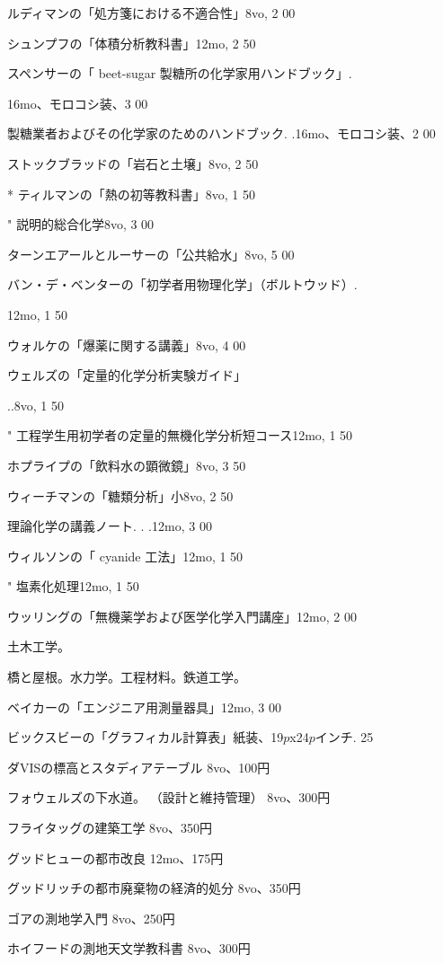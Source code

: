 \documentclass[a4paper,11pt,openany]{ltjsbook}
\begin{document}
ルディマンの「処方箋における不適合性」8vo, 2 00

シュンプフの「体積分析教科書」12mo, 2 50

スペンサーの「 beet-sugar 製糖所の化学家用ハンドブック」.

16mo、モロコシ装、3 00

製糖業者およびその化学家のためのハンドブック. .16mo、モロコシ装、2 00

ストックブラッドの「岩石と土壌」8vo, 2 50

* ティルマンの「熱の初等教科書」8vo, 1 50

"          説明的総合化学8vo, 3 00

ターンエアールとルーサーの「公共給水」8vo, 5 00

バン・デ・ベンターの「初学者用物理化学」（ボルトウッド）.

12mo, 1 50

ウォルケの「爆薬に関する講義」8vo, 4 00

ウェルズの「定量的化学分析実験ガイド」

..8vo, 1 50

"      工程学生用初学者の定量的無機化学分析短コース12mo, 1 50

ホプライプの「飲料水の顕微鏡」8vo, 3 50

ウィーチマンの「糖類分析」小8vo, 2 50

理論化学の講義ノート. .  .12mo, 3 00

ウィルソンの「 cyanide 工法」12mo, 1 50

"        塩素化処理12mo, 1 50

ウッリングの「無機薬学および医学化学入門講座」12mo, 2 00

土木工学。

橋と屋根。水力学。工程材料。鉄道工学。

ベイカーの「エンジニア用測量器具」12mo, 3 00

ビックスビーの「グラフィカル計算表」紙装、19$p$x24$p$インチ. 25

ダVISの標高とスタディアテーブル 8vo、100円

フォウェルズの下水道。 （設計と維持管理） 8vo、300円

フライタッグの建築工学 8vo、350円

グッドヒューの都市改良 12mo、175円

グッドリッチの都市廃棄物の経済的処分 8vo、350円

ゴアの測地学入門 8vo、250円

ホイフードの測地天文学教科書 8vo、300円
\end{document}
